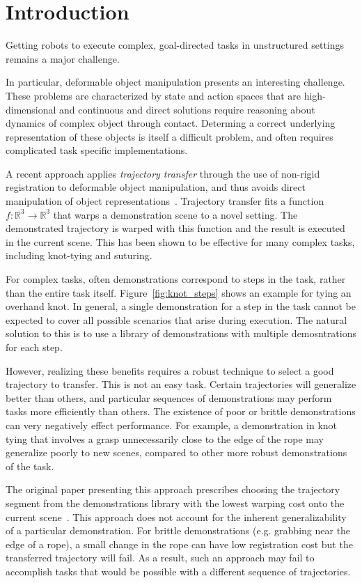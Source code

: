 \section{Introduction}
Getting robots to execute complex,
goal-directed tasks in unstructured settings remains a major challenge.

In particular, deformable object manipulation presents an interesting challenge.
These problems are characterized by state and action spaces that are high-dimensional 
and continuous and direct solutions require reasoning about dynamics of complex object 
through contact.
Determing a correct underlying representation of these objects is itself a difficult problem,
and often requires complicated task specific implementations.

A recent approach applies \emph{trajectory transfer} through the use of
non-rigid registration to deformable object manipulation, and thus avoids
direct manipulation of object representations~\cite{Schulmanetal_IROS2013, Schulmanetal_ISRR2013}.
Trajectory transfer fits a
function $f:\mathbb{R}^3 \rightarrow \mathbb{R}^3$ that warps a demonstration
scene to a novel setting.  The demonstrated trajectory is warped with this
function and the result is executed in the current scene.  This has been shown
to be effective for many complex tasks, including knot-tying and suturing.

For complex tasks, often demonstrations correspond to steps in the task, rather
than the entire task itself. Figure~\ref{fig:knot_steps} shows an example
for tying an overhand knot.
In general, a single demonstration for a step in the task cannot be expected
to cover all possible scenarios that arise during execution.
The natural solution to this is to use a library of demonstrations with
multiple demosntrations for each step.

However, realizing these benefits requires a robust technique to select a good trajectory to
transfer.
This is not an easy task.
Certain trajectories will generalize better than others, and particular sequences of 
demonstrations may perform tasks more efficiently than others.
The existence of poor or brittle demonstrations can very negatively 
effect performance.
For example, a demonstration in knot tying that involves a grasp
unnecessarily close to the edge of the rope may generalize poorly
to new scenes, compared to other more robust demonstrations of the task.

The original paper presenting this approach
prescribes choosing the trajectory segment from the demonstrations
library with the lowest warping cost onto the current scene~\cite{Schulmanetal_ISRR2013}.
This approach does not account for the inherent generalizability
of a particular demonstration. For brittle demonstrations (e.g. grabbing
near the edge of a rope), a small change in the rope can have low registration
cost but the transferred trajectory will fail.
As a result, such an approach may fail to accomplish tasks
that would be possible with a different sequence of trajectories.

